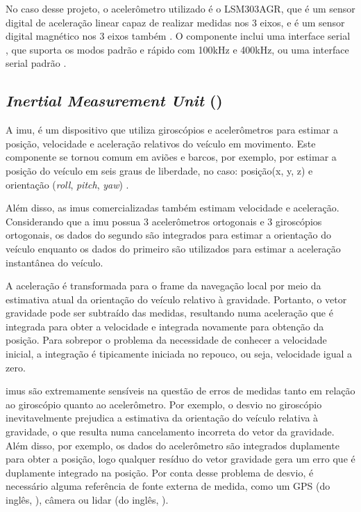 \documentclass[acronym, symbols, table, deposito]{fei}
\begin{document}
				No caso desse projeto, o acelerômetro utilizado é o LSM303AGR, que é um sensor digital de aceleração linear capaz de realizar medidas nos 3 eixos, e é um sensor digital magnético nos 3 eixos também \cite{datasheet_accel}. O componente inclui uma interface serial , que suporta os modos padrão e rápido com 100kHz e 400kHz, ou uma interface serial padrão .
				
			\subsection{\textit{Inertial Measurement Unit} ()}
			
				A \acrshort{imu}, é um dispositivo que utiliza giroscópios e acelerômetros para estimar a posição, velocidade e aceleração relativos do veículo em movimento. Este componente se tornou comum em aviões e barcos, por exemplo, por estimar a posição do veículo em seis graus de liberdade, no caso: posição(x, y, z) e orientação (\textit{roll}, \textit{pitch}, \textit{yaw}) \cite{siegwart2011introduction}.
				
				Além disso, as \acrshort{imu}s comercializadas também estimam velocidade e aceleração. Considerando que a \acrshort{imu} possua 3 acelerômetros ortogonais e 3 giroscópios ortogonais, os dados do segundo são integrados para estimar a orientação do veículo enquanto os dados do primeiro são utilizados para estimar a aceleração instantânea do veículo.
				
				A aceleração é transformada para o frame da navegação local por meio da estimativa atual da orientação do veículo relativo à gravidade. Portanto, o vetor gravidade pode ser subtraído das medidas, resultando numa aceleração que é integrada para obter a velocidade e integrada novamente para obtenção da posição. Para sobrepor o problema da necessidade de conhecer a velocidade inicial, a integração é tipicamente iniciada no repouco, ou seja, velocidade igual a zero.
				
				\acrshort{imu}s são extremamente sensíveis na questão de erros de medidas tanto em relação ao giroscópio quanto ao acelerômetro. Por exemplo, o desvio no giroscópio inevitavelmente prejudica a estimativa da orientação do veículo relativa à gravidade, o que resulta numa cancelamento incorreta do vetor da gravidade. Além disso, por exemplo, os dados do acelerômetro são integrados duplamente para obter a posição, logo qualquer resíduo do vetor gravidade gera um erro que é duplamente integrado na posição. Por conta desse problema de desvio, é necessário alguma referência de fonte externa de medida, como um GPS (do inglês, ), câmera ou \acrshort{lidar} (do inglês, ).
		
\end{document}
